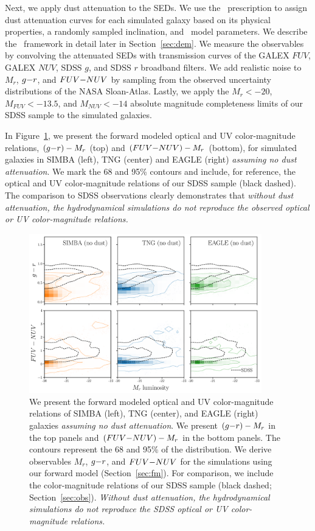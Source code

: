 Next, we apply dust attenuation to the SEDs. We use the \eda~prescription
to assign dust attenuation curves for each simulated galaxy based on its physical
properties, a randomly sampled inclination, and \eda~model parameters. We
describe the \eda~framework in detail later in Section~\ref{sec:dem}. We
measure the observables by convolving the attenuated SEDs with transmission
curves of the GALEX $FUV$, GALEX $NUV$, SDSS $g$, and SDSS $r$ broadband
filters. We add realistic noise to $M_r$, $g{-}r$, and $FUV{-}NUV$ by sampling
from the observed uncertainty distributions of the NASA Sloan-Atlas.
Lastly, we apply the $M_r < -20$, $M_{FUV} < -13.5$, and $M_{NUV} < -14$
absolute magnitude completeness limits of our SDSS sample to the simulated 
galaxies. 

In Figure~\ref{fig:obs}, we present the forward modeled optical and UV
color-magnitude relations, $(g{-}r)-M_r$ (top) and $(FUV{-}NUV)-M_r$ (bottom),
for simulated galaxies in SIMBA (left), TNG (center) and EAGLE (right)
\emph{assuming no dust attenuation}. We mark the 68 and 95\% contours and
include, for reference, the optical and UV color-magnitude relations of our
SDSS sample (black dashed). 
The comparison to SDSS observations clearly demonstrates
that {\em without dust attenuation, the hydrodynamical simulations do not
reproduce the observed optical or UV color-magnitude relations.}

\begin{figure}
\begin{center}
\includegraphics[width=0.9\textwidth]{figs/observables.pdf} 
    \caption{\label{fig:obs}
    We present the forward modeled optical and UV color-magnitude relations
    of SIMBA (left), TNG (center), and EAGLE (right) galaxies
    \emph{assuming no dust attenuation}. We present $(g{-}r)-M_r$ in the top
    panels and $(FUV{-}NUV)-M_r$ in the bottom panels. The contours represent
    the 68 and 95\% of the distribution. We derive observables $M_r$, $g{-}r$, 
    and $FUV{-}NUV$ for the simulations using our forward model
    (Section~\ref{sec:fm}). For comparison, we include the color-magnitude
    relations of our SDSS sample (black dashed; Section~\ref{sec:obs}). 
    {\em Without dust attenuation, the hydrodynamical simulations do not
    reproduce the SDSS optical or UV color-magnitude relations.}
    }
\end{center}
\end{figure}
